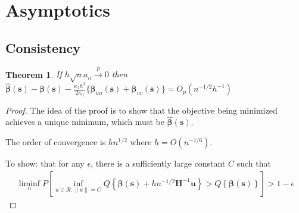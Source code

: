 \documentclass[authoryear, review, 11pt]{elsarticle}
\newtheorem{theorem}{Theorem}[section]
\begin{document}
  
\section{Asymptotics}
  \subsection{Consistency}
  \begin{theorem}\label{theorem:consistency}     
    If $h \sqrt{n} a_n \xrightarrow{p} 0$ then $\hat{\bm{\beta}}(\bm{s}) - \bm{\beta}(\bm{s}) - \frac{\kappa_2 h^2}{2 \kappa_0} \{ \bm{\beta}_{uu}(\bm{s}) + \bm{\beta}_{vv}(\bm{s}) \} = O_p(n^{-1/2} h^{-1} )$
  \end{theorem}
  
  \begin{proof}
    The idea of the proof is to show that the objective being minimized achieves a unique minimum, which must be $\hat{\bm{\beta}}(\bm{s})$.
    
    The order of convergence is $h n^{1/2}$ where $h = O(n^{-1/6})$.
    
    To show: that for any $\epsilon$, there is a sufficiently large constant $C$ such that
    \begin{align*}
      \liminf \limits_n P \left[ \inf_{u \in \mathcal{R}: \|u\| = C} Q \left\{ \bm{\beta}(\bm{s}) + h n^{-1/2} \bm{H}^{-1} \bm{u} \right\} > Q \left\{ \bm{\beta}(\bm{s}) \right\} \right] > 1 - \epsilon
    \end{align*}
    

\end{proof}
\end{document}
